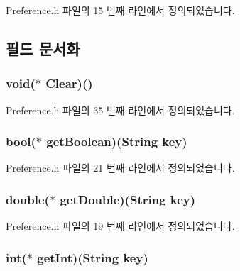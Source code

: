 Preference.\-h 파일의 15 번째 라인에서 정의되었습니다.



\subsection{필드 문서화}
\hypertarget{struct___preference_a38ab41f7f71a3a7e6ae756e158bb812c}{
\subsubsection[{Clear}]{\setlength{\rightskip}{0pt plus 5cm}void($\ast$  Clear)()}}\label{struct___preference_a38ab41f7f71a3a7e6ae756e158bb812c}


Preference.\-h 파일의 35 번째 라인에서 정의되었습니다.

\hypertarget{struct___preference_a4be87827f55abdbd3012520159040082}{
\subsubsection[{get\-Boolean}]{\setlength{\rightskip}{0pt plus 5cm}bool($\ast$  get\-Boolean)({\bf String} key)}}\label{struct___preference_a4be87827f55abdbd3012520159040082}


Preference.\-h 파일의 21 번째 라인에서 정의되었습니다.

\hypertarget{struct___preference_afe52eabc9bccdfbb596972f7ea486ead}{
\subsubsection[{get\-Double}]{\setlength{\rightskip}{0pt plus 5cm}double($\ast$  get\-Double)({\bf String} key)}}\label{struct___preference_afe52eabc9bccdfbb596972f7ea486ead}


Preference.\-h 파일의 19 번째 라인에서 정의되었습니다.

\hypertarget{struct___preference_ade99d80ce928102448db06db94ab9f92}{
\subsubsection[{get\-Int}]{\setlength{\rightskip}{0pt plus 5cm}int($\ast$  get\-Int)({\bf String} key)}}\label{struct___preference_ade99d80ce928102448db06db94ab9f92}


